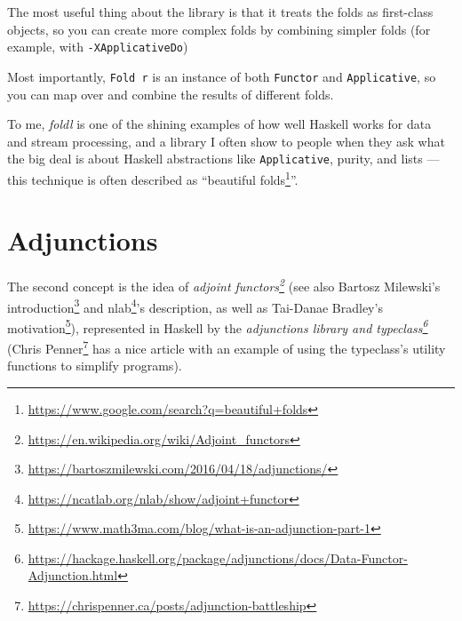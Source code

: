 \documentclass[]{article}
\newenvironment{Shaded}{}{}
\newcommand{\CommentTok}[1]{\textcolor[rgb]{0.38,0.63,0.69}{\textit{#1}}}
\newcommand{\DataTypeTok}[1]{\textcolor[rgb]{0.56,0.13,0.00}{#1}}
\newcommand{\DecValTok}[1]{\textcolor[rgb]{0.25,0.63,0.44}{#1}}
\newcommand{\FunctionTok}[1]{\textcolor[rgb]{0.02,0.16,0.49}{#1}}
\newcommand{\KeywordTok}[1]{\textcolor[rgb]{0.00,0.44,0.13}{\textbf{#1}}}
\newcommand{\NormalTok}[1]{#1}
\newcommand{\OperatorTok}[1]{\textcolor[rgb]{0.40,0.40,0.40}{#1}}
\newcommand{\OtherTok}[1]{\textcolor[rgb]{0.00,0.44,0.13}{#1}}
\renewcommand{\href}[2]{#2\footnote{\url{#1}}}
\begin{document}
The most useful thing about the library is that it treats the folds as
first-class objects, so you can create more complex folds by combining simpler
folds (for example, with \texttt{-XApplicativeDo})

\begin{Shaded}
\end{Shaded}

Most importantly, \texttt{Fold\ r} is an instance of both \texttt{Functor} and
\texttt{Applicative}, so you can map over and combine the results of different
folds.

To me, \emph{foldl} is one of the shining examples of how well Haskell works for
data and stream processing, and a library I often show to people when they ask
what the big deal is about Haskell abstractions like \texttt{Applicative},
purity, and lists --- this technique is often described as
``\href{https://www.google.com/search?q=beautiful+folds}{beautiful folds}''.

\section{Adjunctions}\label{adjunctions}

The second concept is the idea of
\emph{\href{https://en.wikipedia.org/wiki/Adjoint_functors}{adjoint functors}}
(see also \href{https://bartoszmilewski.com/2016/04/18/adjunctions/}{Bartosz
Milewski's introduction} and
\href{https://ncatlab.org/nlab/show/adjoint+functor}{nlab}'s description, as
well as
\href{https://www.math3ma.com/blog/what-is-an-adjunction-part-1}{Tai-Danae
Bradley's motivation}), represented in Haskell by the
\emph{\href{https://hackage.haskell.org/package/adjunctions/docs/Data-Functor-Adjunction.html}{adjunctions
library and typeclass}}
(\href{https://chrispenner.ca/posts/adjunction-battleship}{Chris Penner} has a
nice article with an example of using the typeclass's utility functions to
simplify programs).
\end{document}
